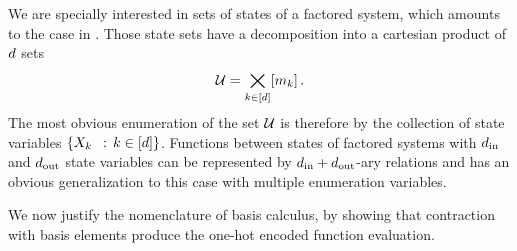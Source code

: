 We are specially interested in sets of states of a factored system, which amounts to the case in .
Those state sets have a decomposition into a cartesian product of $d$ sets
	\[ \mathcal{U} = \bigtimes_{k\in[d]}[m_{k}] \, . \]
The most obvious enumeration of the set $\mathcal{U}$ is therefore by the collection of state variables $\{\catvariableof{\atomenumerator} \, : \, \atomenumeratorin \}$.
Functions between states of factored systems with $d_{\mathrm{in}}$ and $d_{\mathrm{out}}$ state variables can be represented by $d_{\mathrm{in}}+d_{\mathrm{out}}$-ary relations and  has an obvious generalization to this case with multiple enumeration variables.

%
%




We now justify the nomenclature of basis calculus, by showing that contraction with basis elements produce the one-hot encoded function evaluation.

